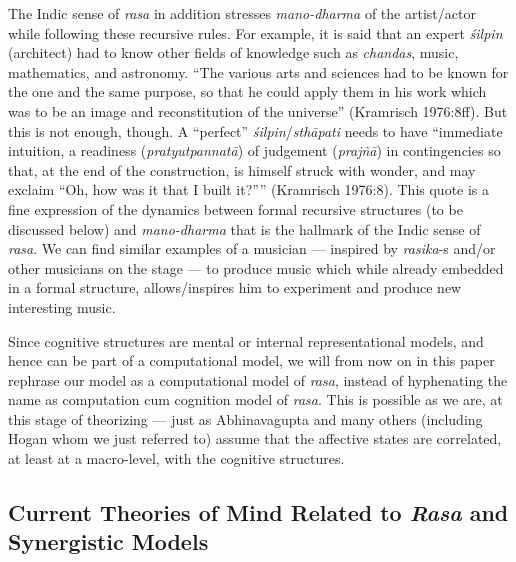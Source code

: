 The Indic sense of \textsl{rasa} in addition stresses \textsl{mano-dharma} of the artist/actor while following these recursive rules. For example, it is said that an expert \textsl{śilpin} (architect) had to know other fields of knowledge such as \textsl{chandas}, music, mathematics, and astronomy. “The various arts and sciences had to be known for the one and the same purpose, so that he could apply them in his work which was to be an image and reconstitution of the universe” (Kramrisch 1976:8ff). But this is not enough, though. A “perfect” \textsl{śilpin}/\textsl{sthāpati} needs to have “immediate intuition, a readiness (\textsl{pratyutpannatā}) of judgement (\textsl{prajñā}) in contingencies so that, at the end of the construction, is himself struck with wonder, and may exclaim “Oh, how was it that I built it?”” (Kramrisch 1976:8). This quote is a fine expression of the dynamics between formal recursive structures (to be discussed below) and \textsl{mano-dharma} that is the hallmark of the Indic sense of \textsl{rasa}. We can find similar examples of a musician --- inspired by \textsl{rasika}-s and/or other musicians on the stage --- to produce music which while  already embedded in a formal structure, allows/inspires him to experiment and produce new interesting music.

Since cognitive structures are mental or internal representational models, and hence can be part of a computational model, we will from now on in this paper rephrase our model as a computational model of \textsl{rasa}, instead of hyphenating the name as computation cum cognition model of \textsl{rasa}. This is possible as we are, at this stage of theorizing --- just as Abhinavagupta and many others (including Hogan whom we just referred to) assume that the affective states are correlated, at least at a macro-level, with the cognitive structures.

\subsection{Current Theories of Mind Related to \textsl{Rasa} and Synergistic Models}\label{chap3-sec3.1}

